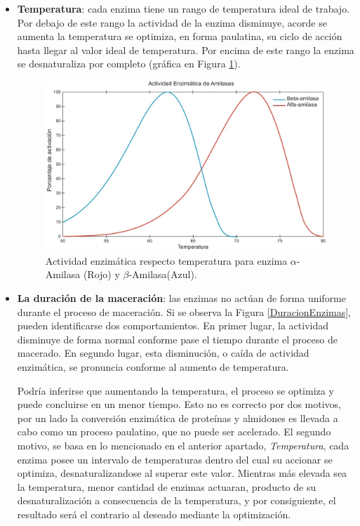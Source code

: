                 \begin{itemize}
                
                    \item {\textbf{Temperatura}:} cada enzima tiene un rango de temperatura ideal de trabajo. Por debajo de este rango la actividad de la enzima disminuye, acorde se aumenta la temperatura se optimiza, en forma paulatina, su ciclo de acción hasta llegar al valor ideal de temperatura. Por encima de este rango la enzima se desnaturaliza por completo (gráfica en Figura \ref{TemperaturaEnzimas}).
                    \\ %
                    \begin{figure} [h]		                                                                \centerline{\includegraphics[scale=0.4]{temperatura_amilasas.jpg}}
		                \caption{Actividad enzimática respecto temperatura para enzima $\alpha$-Amilasa (Rojo) y $\beta$-Amilasa(Azul).}
	                    \label{TemperaturaEnzimas}
    	           \end{figure}
    	           
    	            \item {\textbf{La duración de la maceración}:} las enzimas no actúan de forma uniforme durante el proceso de maceración. Si se observa la Figura \ref{DuracionEnzimas}, pueden identificarse dos comportamientos. En primer lugar, la actividad disminuye de forma normal conforme pase el tiempo durante el proceso de macerado. En segundo lugar, esta disminución, o caída de actividad enzimática, se pronuncia conforme al aumento de temperatura.
    	            
    	            \par Podría inferirse que aumentando la temperatura, el proceso se optimiza y puede concluirse en un menor tiempo. Esto no es correcto por dos motivos, por un lado la conversión enzimática de proteínas y almidones es llevada a cabo como un proceso paulatino, que no puede ser acelerado. El segundo motivo, se basa en lo mencionado en el anterior apartado, \textit{Temperatura}, cada enzima posee un intervalo de temperaturas dentro del cual su accionar se optimiza, desnaturalizandose al superar este valor. Mientras más elevada sea la temperatura, menor cantidad de enzimas actuaran, producto de su desnaturalización a consecuencia de la temperatura, y por consiguiente, el resultado será el contrario al deseado mediante la optimización.
    	            

\end{itemize}
